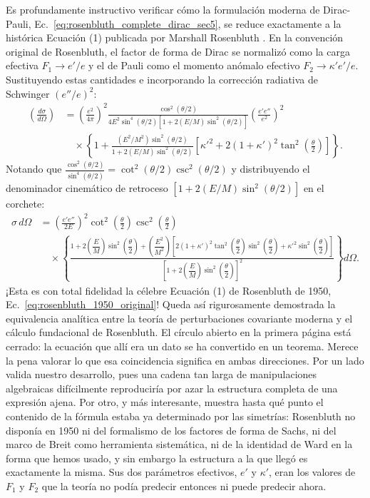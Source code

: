 \documentclass[10pt,a4paper]{article}
\begin{document}
Es profundamente instructivo verificar cómo la formulación moderna de Dirac-Pauli, Ec.~\eqref{eq:rosenbluth_complete_dirac_sec5}, se reduce exactamente a la histórica Ecuación (1) publicada por Marshall Rosenbluth \cite{rosenbluth1950}. En la convención original de Rosenbluth, el factor de forma de Dirac se normalizó como la carga efectiva $F_1 \to e'/e$ y el de Pauli como el momento anómalo efectivo $F_2 \to \kappa' e'/e$. Sustituyendo estas cantidades e incorporando la corrección radiativa de Schwinger $(e''/e)^2$:
\begin{align}
\left(\frac{d\sigma}{d\Omega}\right) &= \left(\frac{e^2}{4\pi}\right)^2 \frac{\cos^2(\theta/2)}{4E^2 \sin^4(\theta/2) [1 + 2(E/M)\sin^2(\theta/2)]} \left(\frac{e' e''}{e^2}\right)^2 \nonumber \\
&\quad \times \left\{ 1 + \frac{(E^2/M^2)\sin^2(\theta/2)}{1 + 2(E/M)\sin^2(\theta/2)} \left[ {\kappa'}^2 + 2(1+\kappa')^2 \tan^2\left(\frac{\theta}{2}\right) \right] \right\}.
\end{align}
Notando que $\frac{\cos^2(\theta/2)}{\sin^4(\theta/2)} = \cot^2(\theta/2) \csc^2(\theta/2)$ y distribuyendo el denominador cinemático de retroceso $[1 + 2(E/M)\sin^2(\theta/2)]$ en el corchete:
\begin{equation}
\begin{aligned}
\sigma \, d\Omega &= \left(\frac{e' e''}{2E}\right)^2 \cot^2\left(\frac{\theta}{2}\right) \csc^2\left(\frac{\theta}{2}\right) \\
&\quad \times \left\{ \frac{1 + 2\left(\dfrac{E}{M}\right)\sin^2\left(\dfrac{\theta}{2}\right) + \left(\dfrac{E^2}{M^2}\right)\left[ 2(1+\kappa')^2 \tan^2\left(\dfrac{\theta}{2}\right)\sin^2\left(\dfrac{\theta}{2}\right) + {\kappa'}^2 \sin^2\left(\dfrac{\theta}{2}\right) \right]}{\left[1 + 2\left(\dfrac{E}{M}\right)\sin^2\left(\dfrac{\theta}{2}\right)\right]^2} \right\} d\Omega.
\end{aligned}
\end{equation}
¡Esta es con total fidelidad la célebre Ecuación (1) de Rosenbluth de 1950, Ec.~\eqref{eq:rosenbluth_1950_original}! Queda así rigurosamente demostrada la equivalencia analítica entre la teoría de perturbaciones covariante moderna y el cálculo fundacional de Rosenbluth. El círculo abierto en la primera página está cerrado: la ecuación que allí era un dato se ha convertido en un teorema. Merece la pena valorar lo que esa coincidencia significa en ambas direcciones. Por un lado valida nuestro desarrollo, pues una cadena tan larga de manipulaciones algebraicas difícilmente reproduciría por azar la estructura completa de una expresión ajena. Por otro, y más interesante, muestra hasta qué punto el contenido de la fórmula estaba ya determinado por las simetrías: Rosenbluth no disponía en 1950 ni del formalismo de los factores de forma de Sachs, ni del marco de Breit como herramienta sistemática, ni de la identidad de Ward en la forma que hemos usado, y sin embargo la estructura a la que llegó es exactamente la misma. Sus dos parámetros efectivos, $e'$ y $\kappa'$, eran los valores de $F_1$ y $F_2$ que la teoría no podía predecir entonces ni puede predecir ahora.
\end{document}
